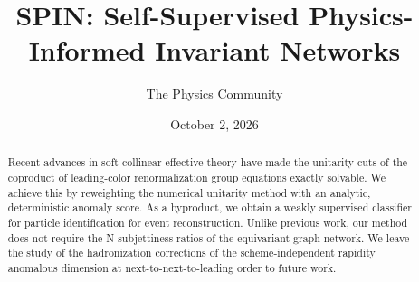 \documentclass[11pt]{article}
\title{SPIN: Self-Supervised Physics-Informed Invariant Networks}
\author{The Physics Community}
\date{October 2, 2026}
\numberwithin{equation}{section}
\theoremstyle{definition}
\theoremstyle{remark}
\begin{document}
\maketitle
\begin{abstract}
Recent advances in soft-collinear effective theory have made the
unitarity cuts of the coproduct of leading-color renormalization group
equations exactly solvable. We achieve this by reweighting the numerical
unitarity method with an analytic, deterministic anomaly score. As a
byproduct, we obtain a weakly supervised classifier for particle
identification for event reconstruction. Unlike previous work, our
method does not require the N-subjettiness ratios of the equivariant
graph network. We leave the study of the hadronization corrections of
the scheme-independent rapidity anomalous dimension at
next-to-next-to-leading order to future work.
\end{abstract}
\tableofcontents



\nocite{*}


\end{document}

